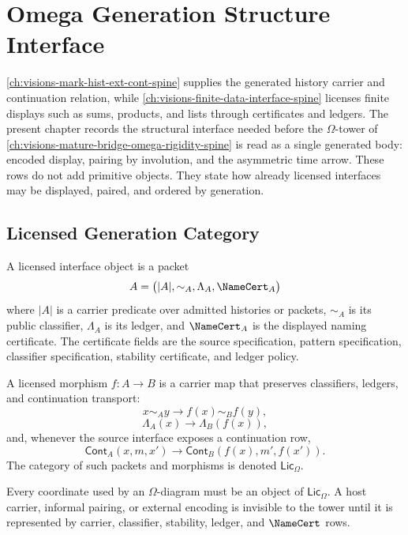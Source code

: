 \chapter{Omega Generation Structure Interface}
\label{ch:visions-omega-generation-structure-interface}

\autoref{ch:visions-mark-hist-ext-cont-spine} supplies the generated
history carrier and continuation relation, while
\autoref{ch:visions-finite-data-interface-spine} licenses finite displays
such as sums, products, and lists through certificates and ledgers. The
present chapter records the structural interface needed before the
$\Omega$-tower of
\autoref{ch:visions-mature-bridge-omega-rigidity-spine} is read as a
single generated body: encoded display, pairing by involution, and the
asymmetric time arrow. These rows do not add primitive objects. They state
how already licensed interfaces may be displayed, paired, and ordered by
generation.

\section{Licensed Generation Category}
\label{sec:omega-generation-licensed-category}

\begin{definition}
\label{def:omega-generation-licensed-interface-object}
A licensed interface object is a packet
$$
A=
\bigl(|A|,\sim_A,\Lambda_A,\NameCert_A\bigr)
$$
where $|A|$ is a carrier predicate over admitted histories or packets,
$\sim_A$ is its public classifier, $\Lambda_A$ is its ledger, and
$\NameCert_A$ is the displayed naming certificate. The certificate fields
are the source specification, pattern specification, classifier
specification, stability certificate, and ledger policy.
\end{definition}

\begin{definition}
\label{def:omega-generation-licensed-morphism}
A licensed morphism $f:A\to B$ is a carrier map that preserves classifiers,
ledgers, and continuation transport:
$$
x\sim_A y
\to
f(x)\sim_B f(y),
$$
$$
\Lambda_A(x)
\to
\Lambda_B(f(x)),
$$
and, whenever the source interface exposes a continuation row,
$$
\mathsf{Cont}_A(x,m,x')
\to
\mathsf{Cont}_B(f(x),m',f(x')).
$$
The category of such packets and morphisms is denoted
$\mathsf{Lic}_{\Omega}$.
\end{definition}

\begin{principle}
\label{prin:omega-generation-no-unlicensed-coordinates}
Every coordinate used by an $\Omega$-diagram must be an object of
$\mathsf{Lic}_{\Omega}$. A host carrier, informal pairing, or external
encoding is invisible to the tower until it is represented by carrier,
classifier, stability, ledger, and $\NameCert$ rows.
\end{principle}

